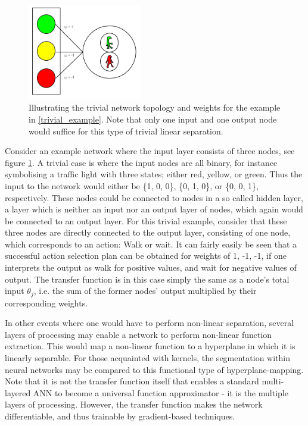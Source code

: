 \begin{figure}
\centering
\includegraphics[width=5cm]{fig/trivial_example}
\caption{Illustrating the trivial network topology and weights for the example in \ref{trivial_example}. Note that only one input and one output node would suffice for this type of trivial linear separation.}
\label{fig:trivial_example}
\end{figure}

Consider an example network where the input layer consists of three nodes, see figure \ref{fig:trivial_example}. A trivial case is where the input nodes are all binary, for instance symbolising a traffic light with three states; either red, yellow, or green. Thus the input to the network would either be \{1, 0, 0\}, \{0, 1, 0\}, or \{0, 0, 1\}, respectively. These nodes could be connected to nodes in a so called hidden layer, a layer which is neither an input nor an output layer of nodes, which again would be connected to an output layer. For this trivial example, consider that these three nodes are directly connected to the output layer, consisting of one node, which corresponds to an action: Walk or wait. It can fairly easily be seen that a successful action selection plan can be obtained for weights of {1, -1, -1}, if one interprets the output as walk for positive values, and wait for negative values of output. The transfer function is in this case simply the same as a node's total input $\theta_j$, i.e. the sum of the former nodes' output multiplied by their corresponding weights. 

In other events where one would have to perform non-linear separation, several layers of processing may enable a network to perform non-linear function extraction. This would map a non-linear function to a hyperplane in which it is linearly separable. For those acquainted with kernels, the segmentation within neural networks may be compared to this functional type of hyperplane-mapping. Note that it is not the transfer function itself that enables a standard multi-layered ANN to become a universal function approximator - it is the multiple layers of processing. However, the transfer function makes the network differentiable, and thus trainable by gradient-based techniques.

